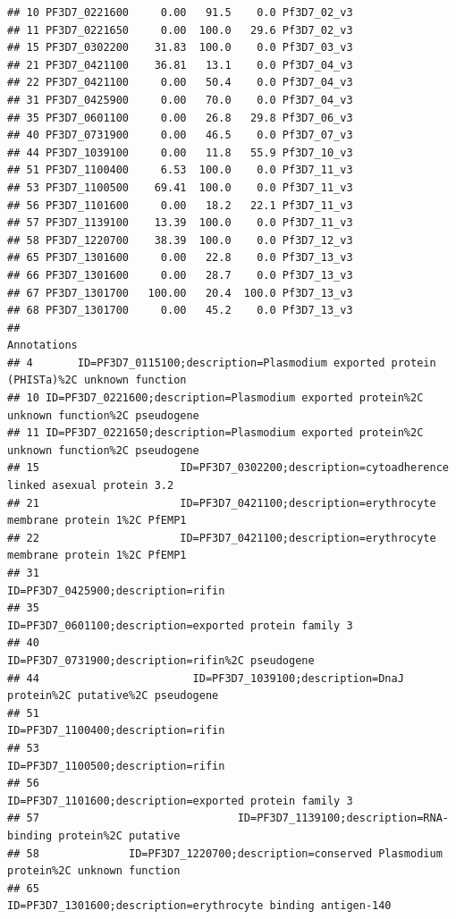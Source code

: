 \documentclass[12pt, a4paper]{article}\usepackage[]{graphicx}\usepackage[]{color}
\makeatletter
\newenvironment{kframe}{%
 \def\at@end@of@kframe{}%
 \ifinner\ifhmode%
  \def\at@end@of@kframe{\end{minipage}}%
  \begin{minipage}{\columnwidth}%
 \fi\fi%
 \def\FrameCommand##1{\hskip\@totalleftmargin \hskip-\fboxsep
 \colorbox{shadecolor}{##1}\hskip-\fboxsep
     \hskip-\linewidth \hskip-\@totalleftmargin \hskip\columnwidth}%
 \MakeFramed {\advance\hsize-\width
   \@totalleftmargin\z@ \linewidth\hsize
   \@setminipage}}%
 {\par\unskip\endMakeFramed%
 \at@end@of@kframe}
\newenvironment{knitrout}{}{} %
\makeatother
\begin{document}
\begin{knitrout}
\begin{kframe}
\begin{verbatim}
## 10 PF3D7_0221600     0.00   91.5    0.0 Pf3D7_02_v3
## 11 PF3D7_0221650     0.00  100.0   29.6 Pf3D7_02_v3
## 15 PF3D7_0302200    31.83  100.0    0.0 Pf3D7_03_v3
## 21 PF3D7_0421100    36.81   13.1    0.0 Pf3D7_04_v3
## 22 PF3D7_0421100     0.00   50.4    0.0 Pf3D7_04_v3
## 31 PF3D7_0425900     0.00   70.0    0.0 Pf3D7_04_v3
## 35 PF3D7_0601100     0.00   26.8   29.8 Pf3D7_06_v3
## 40 PF3D7_0731900     0.00   46.5    0.0 Pf3D7_07_v3
## 44 PF3D7_1039100     0.00   11.8   55.9 Pf3D7_10_v3
## 51 PF3D7_1100400     6.53  100.0    0.0 Pf3D7_11_v3
## 53 PF3D7_1100500    69.41  100.0    0.0 Pf3D7_11_v3
## 56 PF3D7_1101600     0.00   18.2   22.1 Pf3D7_11_v3
## 57 PF3D7_1139100    13.39  100.0    0.0 Pf3D7_11_v3
## 58 PF3D7_1220700    38.39  100.0    0.0 Pf3D7_12_v3
## 65 PF3D7_1301600     0.00   22.8    0.0 Pf3D7_13_v3
## 66 PF3D7_1301600     0.00   28.7    0.0 Pf3D7_13_v3
## 67 PF3D7_1301700   100.00   20.4  100.0 Pf3D7_13_v3
## 68 PF3D7_1301700     0.00   45.2    0.0 Pf3D7_13_v3
##                                                                                   Annotations
## 4       ID=PF3D7_0115100;description=Plasmodium exported protein (PHISTa)%2C unknown function
## 10 ID=PF3D7_0221600;description=Plasmodium exported protein%2C unknown function%2C pseudogene
## 11 ID=PF3D7_0221650;description=Plasmodium exported protein%2C unknown function%2C pseudogene
## 15                      ID=PF3D7_0302200;description=cytoadherence linked asexual protein 3.2
## 21                      ID=PF3D7_0421100;description=erythrocyte membrane protein 1%2C PfEMP1
## 22                      ID=PF3D7_0421100;description=erythrocyte membrane protein 1%2C PfEMP1
## 31                                                         ID=PF3D7_0425900;description=rifin
## 35                                     ID=PF3D7_0601100;description=exported protein family 3
## 40                                           ID=PF3D7_0731900;description=rifin%2C pseudogene
## 44                        ID=PF3D7_1039100;description=DnaJ protein%2C putative%2C pseudogene
## 51                                                         ID=PF3D7_1100400;description=rifin
## 53                                                         ID=PF3D7_1100500;description=rifin
## 56                                     ID=PF3D7_1101600;description=exported protein family 3
## 57                               ID=PF3D7_1139100;description=RNA-binding protein%2C putative
## 58              ID=PF3D7_1220700;description=conserved Plasmodium protein%2C unknown function
## 65                               ID=PF3D7_1301600;description=erythrocyte binding antigen-140

\end{verbatim}
\end{kframe}
\end{knitrout}
\end{document}
